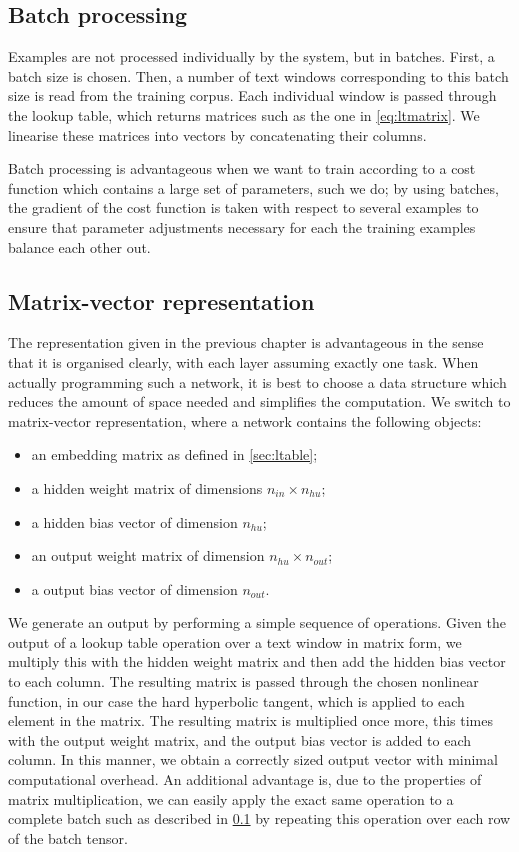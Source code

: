 \subsection{Batch processing}
\label{sec:batch}
Examples are not processed individually by the system, but in
batches. First, a batch size is chosen. Then, a number of text windows
corresponding to this batch size is read from the training
corpus. Each individual window is passed through the lookup table,
which returns matrices such as the one in \ref{eq:ltmatrix}. We
linearise these matrices into vectors by concatenating their columns.

Batch processing is advantageous when we want to train according to a
cost function which contains a large set of parameters, such we do; by
using batches, the gradient of the cost function is taken with respect
to several examples to ensure that parameter adjustments necessary for
each the training examples balance each other out.

\subsection{Matrix-vector representation}
\label{sec:matrixvectorreps}
The representation given in the previous chapter is advantageous in
the sense that it is organised clearly, with each layer assuming
exactly one task. When actually programming such a network, it is best
to choose a data structure which reduces the amount of space needed
and simplifies the computation. We switch to matrix-vector
representation, where a network contains the following objects:

\begin{itemize}
\item an embedding matrix as defined in \ref{sec:ltable};
\item a hidden weight matrix of dimensions $n_{in} \times n_{hu}$;
\item a hidden bias vector of dimension $n_{hu}$;
\item an output weight matrix of dimension $n_{hu} \times n_{out}$;
\item a output bias vector of dimension $n_{out}$.
\end{itemize}

We generate an output by performing a simple sequence of
operations. Given the output of a lookup table operation over a text
window in matrix form, we multiply this with the hidden weight matrix
and then add the hidden bias vector to each column. The resulting
matrix is passed through the chosen nonlinear function, in our case the
hard hyperbolic tangent, which is applied to each element in the
matrix. The resulting matrix is multiplied once more, this times with
the output weight matrix, and the output bias vector is added to each
column. In this manner, we obtain a correctly sized output vector with
minimal computational overhead. An additional advantage is, due to the
properties of matrix multiplication, we can easily apply the exact
same operation to a complete batch such as described in
\ref{sec:batch} by repeating this operation over each row of the batch
tensor.

